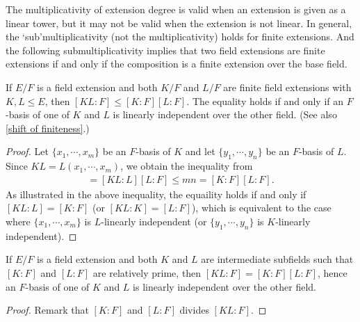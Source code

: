 The multiplicativity of extension degree is valid when an extension is given as a linear tower, but it may not be valid when the extension is not linear.
In general, the `sub'multiplicativity (not the multiplicativity) holds for finite extensions.
And the following submultiplicativity implies that two field extensions are finite extensions if and only if the composition is a finite extension over the base field.
\begin{prop}\label{submultiplicativity of field composition}
    If $E/F$ is a field extension and both $K/F$ and $L/F$ are finite field extensions with $K, L\leq E$, then $[KL: F]\leq[K: F][L: F]$.
    The equality holds if and only if an $F$-basis of one of $K$ and $L$ is linearly independent over the other field.
    (See also \cref{shift of finiteness}.)
\end{prop}
\begin{proof}
    Let $\{x_1, \cdots, x_m\}$ be an $F$-basis of $K$ and let $\{y_1, \cdots, y_n\}$ be an $F$-basis of $L$.
    Since $KL=L(x_1, \cdots, x_m)$, we obtain the inequality from
    \begin{align*}
        [KL:F]=[KL:L][L:F]\leq mn=[K:F][L:F].
    \end{align*}
    As illustrated in the above inequality, the equaility holds if and only if $[KL:L]=[K:F]$ (or $[KL:K]=[L:F]$), which is equivalent to the case where $\{x_1, \cdots, x_m\}$ is $L$-linearly independent (or $\{y_1, \cdots, y_n\}$ is $K$-linearly independent).
\end{proof}
\begin{cor}
    If $E/F$ is a field extension and both $K$ and $L$ are intermediate subfields such that $[K:F]$ and $[L:F]$ are relatively prime, then $[KL:F]=[K:F][L:F]$, hence an $F$-basis of one of $K$ and $L$ is linearly independent over the other field.
\end{cor}
\begin{proof}
    Remark that $[K:F]$ and $[L:F]$ divides $[KL:F]$.
\end{proof}

